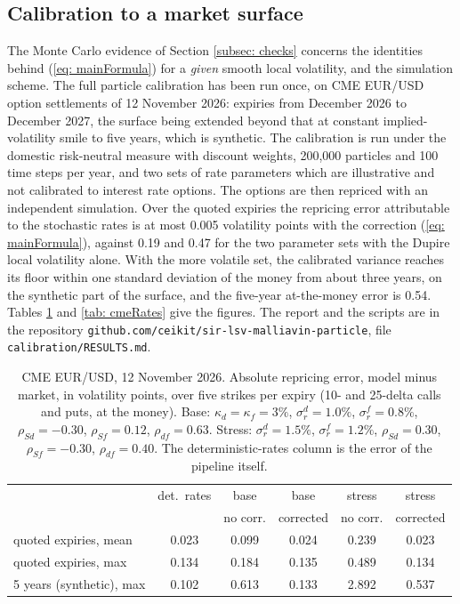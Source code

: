\subsection{Calibration to a market surface}\label{subsec: cme}
The Monte Carlo evidence of Section \ref{subsec: checks} concerns the identities behind (\ref{eq: mainFormula}) for a \emph{given} smooth local volatility, and the simulation scheme. The full particle calibration has been run once, on CME EUR/USD option settlements of 12 November 2026: expiries from December 2026 to December 2027, the surface being extended beyond that at constant implied-volatility smile to five years, which is synthetic. The calibration is run under the domestic risk-neutral measure with discount weights, 200,000 particles and 100 time steps per year, and two sets of rate parameters which are illustrative and not calibrated to interest rate options. The options are then repriced with an independent simulation. Over the quoted expiries the repricing error attributable to the stochastic rates is at most 0.005 volatility points with the correction (\ref{eq: mainFormula}), against 0.19 and 0.47 for the two parameter sets with the Dupire local volatility alone. With the more volatile set, the calibrated variance reaches its floor within one standard deviation of the money from about three years, on the synthetic part of the surface, and the five-year at-the-money error is 0.54. Tables \ref{tab: cme} and \ref{tab: cmeRates} give the figures. The report and the scripts are in the repository \texttt{github.com/ceikit/sir-lsv-malliavin-particle}, file \texttt{calibration/RESULTS.md}.

\begin{table}[h]
\centering\small
\begin{tabular}{lccccc}
\toprule
 & det.\ rates & base & base & stress & stress \\
 & & no corr. & corrected & no corr. & corrected \\
\midrule
quoted expiries, mean & 0.023 & 0.099 & 0.024 & 0.239 & 0.023 \\
quoted expiries, max & 0.134 & 0.184 & 0.135 & 0.489 & 0.134 \\
5 years (synthetic), max & 0.102 & 0.613 & 0.133 & 2.892 & 0.537 \\
\bottomrule
\end{tabular}
\caption{CME EUR/USD, 12 November 2026. Absolute repricing error, model minus market, in volatility points, over five strikes per expiry (10- and 25-delta calls and puts, at the money). Base: $\kappa_d=\kappa_f=3\%$, $\sigma^d_r=1.0\%$, $\sigma^f_r=0.8\%$, $\rho_{Sd}=-0.30$, $\rho_{Sf}=0.12$, $\rho_{df}=0.63$. Stress: $\sigma^d_r=1.5\%$, $\sigma^f_r=1.2\%$, $\rho_{Sd}=0.30$, $\rho_{Sf}=-0.30$, $\rho_{df}=0.40$. The deterministic-rates column is the error of the pipeline itself.}\label{tab: cme}
\end{table}

